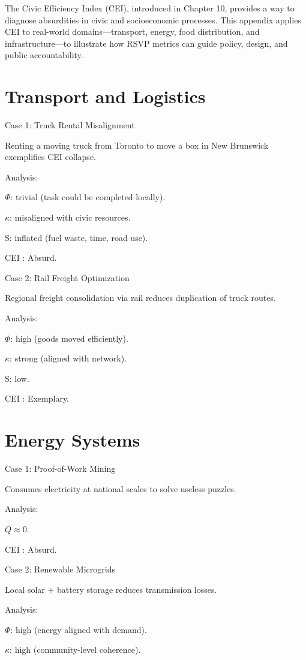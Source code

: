 \documentclass{book}
\begin{document}
The Civic Efficiency Index (CEI), introduced in Chapter 10, provides a way to diagnose absurdities in civic and socioeconomic processes. This appendix applies CEI to real-world domains—transport, energy, food distribution, and infrastructure—to illustrate how RSVP metrics can guide policy, design, and public accountability.

\section{Transport and Logistics}

Case 1: Truck Rental Misalignment

Renting a moving truck from Toronto to move a box in New Brunswick exemplifies CEI collapse.

Analysis:

\(\Phi\): trivial (task could be completed locally).

\(\kappa\): misaligned with civic resources.

S: inflated (fuel waste, time, road use).

CEI : Absurd.

Case 2: Rail Freight Optimization

Regional freight consolidation via rail reduces duplication of truck routes.

Analysis:

\(\Phi\): high (goods moved efficiently).

\(\kappa\): strong (aligned with network).

S: low.

CEI : Exemplary.

\section{Energy Systems}

Case 1: Proof-of-Work Mining

Consumes electricity at national scales to solve useless puzzles.

Analysis:

\( Q \approx 0 \).

CEI : Absurd.

Case 2: Renewable Microgrids

Local solar + battery storage reduces transmission losses.

Analysis:

\(\Phi\): high (energy aligned with demand).

\(\kappa\): high (community-level coherence).
\end{document}
